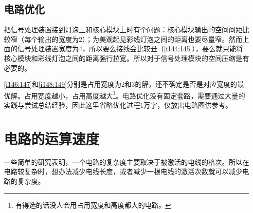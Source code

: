 \subsection{电路优化}

把信号处理装置接到灯泡上和核心模块上时有个问题：核心模块输出的空间间距比较窄（每个输出的宽度为2）；为美观起见彩线灯泡之间的距离也要尽量窄。然而上面的信号处理装置宽度为4，所以要么接线会比较丑（\autoref{i144:145}），要么就只能将核心模块和彩线灯泡之间的距离强行拉宽。所以对于信号处理模块的空间压缩是有必要的。

\begin{figure}[!ht]
\begin{center}
\qquad
{}
\end{center}
\caption{}
\label{i144:145}
\end{figure}

\autoref{i146:147}和\autoref{i148:149}分别是占用宽度为2和3的解，还不确定是否是对应宽度的最优解。占用宽度越小，占用高度越大\footnote{有得选的话没人会用占用宽度和高度都大的电路。}。电路优化没有固定套路，需要通过大量的实践与尝试总结经验，因此这里省略优化过程1万字，仅放出电路图供参考。

\begin{figure}[!ht]
\begin{center}
\qquad
{}
\end{center}
\caption{}
\label{i146:147}
\end{figure}

\begin{figure}[!ht]
\begin{center}
\qquad
{}
\end{center}
\caption{}
\label{i148:149}
\end{figure}

\section{电路的运算速度}
一些简单的研究表明，一个电路的复杂度主要取决于被激活的电线的格次。所以在电路较复杂时，想办法减少电线长度，或者减少一根电线的激活次数就可以减少电路的复杂度。

